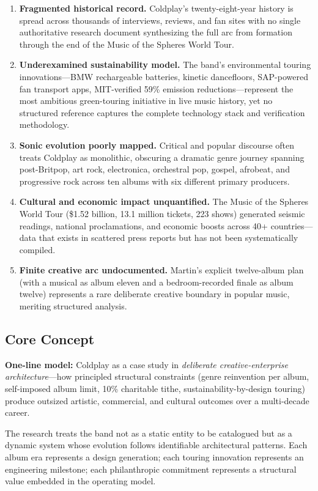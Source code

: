 \documentclass[11pt,letterpaper]{article}
\begin{document}
\begin{enumerate}[leftmargin=2em]
  \item \textbf{Fragmented historical record.} Coldplay's twenty-eight-year history is spread across thousands of interviews, reviews, and fan sites with no single authoritative research document synthesizing the full arc from formation through the end of the Music of the Spheres World Tour.
  \item \textbf{Underexamined sustainability model.} The band's environmental touring innovations---BMW rechargeable batteries, kinetic dancefloors, SAP-powered fan transport apps, MIT-verified 59\% emission reductions---represent the most ambitious green-touring initiative in live music history, yet no structured reference captures the complete technology stack and verification methodology.
  \item \textbf{Sonic evolution poorly mapped.} Critical and popular discourse often treats Coldplay as monolithic, obscuring a dramatic genre journey spanning post-Britpop, art rock, electronica, orchestral pop, gospel, afrobeat, and progressive rock across ten albums with six different primary producers.
  \item \textbf{Cultural and economic impact unquantified.} The Music of the Spheres World Tour (\$1.52 billion, 13.1 million tickets, 223 shows) generated seismic readings, national proclamations, and economic boosts across 40+ countries---data that exists in scattered press reports but has not been systematically compiled.
  \item \textbf{Finite creative arc undocumented.} Martin's explicit twelve-album plan (with a musical as album eleven and a bedroom-recorded finale as album twelve) represents a rare deliberate creative boundary in popular music, meriting structured analysis.
\end{enumerate}

\subsection{Core Concept}

\textbf{One-line model:} Coldplay as a case study in \textit{deliberate creative-enterprise architecture}---how principled structural constraints (genre reinvention per album, self-imposed album limit, 10\% charitable tithe, sustainability-by-design touring) produce outsized artistic, commercial, and cultural outcomes over a multi-decade career.

The research treats the band not as a static entity to be catalogued but as a dynamic system whose evolution follows identifiable architectural patterns. Each album era represents a design generation; each touring innovation represents an engineering milestone; each philanthropic commitment represents a structural value embedded in the operating model.
\end{document}
